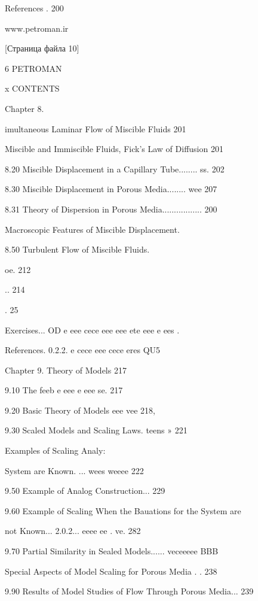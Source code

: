 \documentclass[
  11pt,
]{article}
\begin{document}
References . 200\par
\smallskip
www.petroman.ir\par
\smallskip
\smallskip
{[}Страница файла 10{]}\par
6 PETROMAN\par
\smallskip
x CONTENTS\par
\smallskip
Chapter 8.\par
\smallskip
imultaneous Laminar Flow of Miscible Fluids 201\par
{} Miscible and Immiscible Fluids, Fick's Law of Diffusion 201\par
8.20 Miscible Displacement in a Capillary Tube........ ss. 202\par
8.30 Miscible Displacement in Porous Media........ wee 207\par
8.31 Theory of Dispersion in Porous Media................. 200\par
{} Macroscopic Features of Miscible Displacement.\par
8.50 Turbulent Flow of Miscible Fluids.\par
\smallskip
oe. 212\par
.. 214\par
. 25\par
\smallskip
Exercises... OD e eee cece eee eee ete eee e ees .\par
References. 0.2.2. e cece eee cece eres QU5\par
Chapter 9. Theory of Models 217\par
9.10 The feeb e eee e eee se. 217\par
9.20 Basic Theory of Models eee vee 218,\par
9.30 Scaled Models and Scaling Laws. teens » 221\par
{} Examples of Scaling Analy:\par
\smallskip
System are Known. ... wees weeee 222\par
9.50 Example of Analog Construction... 229\par
9.60 Example of Scaling When the Bauations for the System are\par
\smallskip
not Known... 2.0.2... eeee ee . ve. 282\par
9.70 Partial Similarity in Sealed Models...... veceeeee BBB\par
{} Special Aspects of Model Scaling for Porous Media . . 238\par
9.90 Results of Model Studies of Flow Through Porous Media... 239\par
\end{document}
